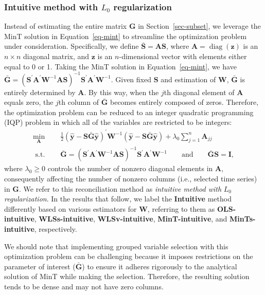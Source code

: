 \documentclass[
  12pt,
  11pt]{article}
\begin{document}
\hypertarget{sec-intuitive}{%
\subsubsection{\texorpdfstring{Intuitive method with \(L_0\)
regularization}{Intuitive method with L\_0 regularization}}\label{sec-intuitive}}

Instead of estimating the entire matrix \(\bm{G}\) in
Section~\ref{sec-subset}, we leverage the MinT solution in
Equation~\ref{eq-mint} to streamline the optimization problem under
consideration. Specifically, we define \(\bar{\bm{S}} = \bm{A}\bm{S}\),
where \(\bm{A} = \operatorname{diag}(\bm{z})\) is an \(n \times n\)
diagonal matrix, and \(\bm{z}\) is an \(n\)-dimensional vector with
elements either equal to 0 or 1. Taking the MinT solution in
Equation~\ref{eq-mint}, we have
\(\bar{\bm{G}} = (\bm{S}^{\prime}\bm{A}^{\prime}\bm{W}^{-1}\bm{A}\bm{S})^{-1}\bm{S}^{\prime}\bm{A}^{\prime}\bm{W}^{-1}\).
Given fixed \(\bm{S}\) and estimation of \(\bm{W}\), \(\bar{\bm{G}}\) is
entirely determined by \(\bm{A}\). By this way, when the \(j\)th
diagonal element of \(\bm{A}\) equals zero, the \(j\)th column of
\(\bar{\bm{G}}\) becomes entirely composed of zeros. Therefore, the
optimization problem can be reduced to an integer quadratic programming
(IQP) problem in which all of the variables are restricted to be
integers: \begin{align*}
\min _{\bm{A}} \quad & \frac{1}{2}\left(\hat{\bm{y}}-\bm{S}\bar{\bm{G}}\hat{\bm{y}}\right)^{\prime} \bm{W}^{-1}\left(\hat{\bm{y}}-\bm{S}\bar{\bm{G}}\hat{\bm{y}}\right) + \lambda_0 \sum_{j=1}^n \bm{A}_{jj} \\
\text { s.t. } \quad & \bar{\bm{G}} = (\bm{S}^{\prime}\bm{A}^{\prime}\bm{W}^{-1}\bm{A}\bm{S})^{-1}\bm{S}^{\prime}\bm{A}^{\prime}\bm{W}^{-1} \qquad\text{and}\qquad \bar{\bm{G}}\bm{S} = \bm{I},
\end{align*} where \(\lambda_0 \geq 0\) controls the number of nonzero
diagonal elements in \(\bm{A}\), consequently affecting the number of
nonzero columns (i.e., selected time series) in \(\bm{G}\). We refer to
this reconciliation method as \emph{intuitive method with} \(L_0\)
\emph{regularization}. In the results that follow, we label the
\textbf{Intuitive} method differently based on various estimators for
\(\bm{W}\), referring to them as \textbf{OLS-intuitive},
\textbf{WLSs-intuitive}, \textbf{WLSv-intuitive},
\textbf{MinT-intuitive}, and \textbf{MinTs-intuitive}, respectively.

We should note that implementing grouped variable selection with this
optimization problem can be challenging because it imposes restrictions
on the parameter of interest (\(\bar{\bm{G}}\)) to ensure it adheres
rigorously to the analytical solution of MinT while making the
selection. Therefore, the resulting solution tends to be dense and may
not have zero columns.
\end{document}

